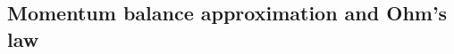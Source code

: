 \documentclass[11pt,letterpaper]{article}
\begin{document}


\subsection{Momentum balance approximation and Ohm's law}
\end{document}
